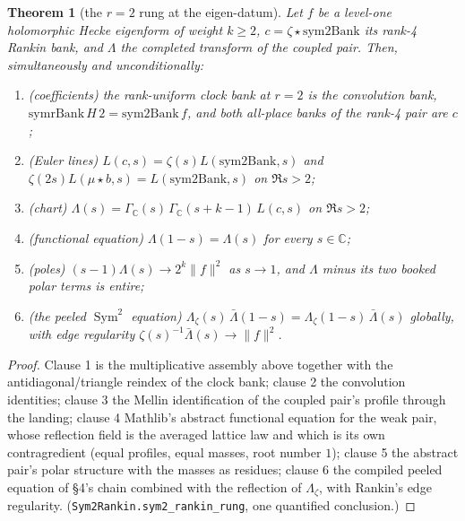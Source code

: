\documentclass[11pt]{article}
\newtheorem{theorem}{Theorem}
\newcommand{\Sym}{\operatorname{Sym}}
\newcommand{\Gm}{\Gamma_{\mathbb C}}
\begin{document}
\begin{theorem}[the $r=2$ rung at the eigen-datum]\label{thm:rung}
Let $f$ be a level-one holomorphic Hecke eigenform of weight $k\ge2$, $c=\zeta\star
\mathrm{sym2Bank}$ its rank-4 Rankin bank, and $\Lambda$ the completed transform of the coupled
pair.  Then, simultaneously and unconditionally:
\begin{enumerate}
\item \textup{(coefficients)} the rank-uniform clock bank at $r=2$ is the convolution bank,
  $\mathrm{symrBank}\,H\,2=\mathrm{sym2Bank}\,f$, and both all-place banks of the rank-4 pair
  are $c$;
\item \textup{(Euler lines)} $L(c,s)=\zeta(s)L(\mathrm{sym2Bank},s)$ and
  $\zeta(2s)L(\mu\star b,s)=L(\mathrm{sym2Bank},s)$ on $\Re s>2$;
\item \textup{(chart)} $\Lambda(s)=\Gm(s)\,\Gm(s+k-1)\,L(c,s)$ on $\Re s>2$;
\item \textup{(functional equation)} $\Lambda(1-s)=\Lambda(s)$ for every $s\in\mathbb C$;
\item \textup{(poles)} $(s-1)\Lambda(s)\to2^{k}\|f\|^2$ as $s\to1$, and $\Lambda$ minus its two
  booked polar terms is entire;
\item \textup{(the peeled $\Sym^2$ equation)}
  $\Lambda_\zeta(s)\,\bar\Lambda(1-s)=\Lambda_\zeta(1-s)\,\bar\Lambda(s)$ globally, with edge
  regularity $\zeta(s)^{-1}\bar\Lambda(s)\to\|f\|^2$.
\end{enumerate}
\end{theorem}
\begin{proof}
Clause 1 is the multiplicative assembly above together with the antidiagonal/triangle reindex
of the clock bank; clause 2 the convolution identities; clause 3 the Mellin identification of
the coupled pair's profile through the landing; clause 4 Mathlib's abstract functional equation
for the weak pair, whose reflection field is the averaged lattice law and which is its own
contragredient (equal profiles, equal masses, root number $1$); clause 5 the abstract pair's
polar structure with the masses as residues; clause 6 the compiled peeled equation of \S4's
chain combined with the reflection of $\Lambda_\zeta$, with Rankin's edge regularity.
(\texttt{Sym2Rankin.sym2\_rankin\_rung}, one quantified conclusion.)
\end{proof}
\end{document}
